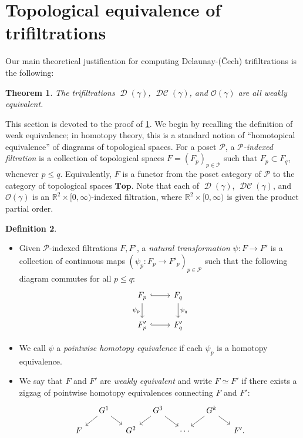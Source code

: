 \documentclass[11pt]{amsart}
\newcommand{\R}{\mathbb{R}} %
\DeclareMathOperator{\Del}{\mathcal{D}}
\DeclareMathOperator{\DelCech}{\mathcal{DC}}
\newcommand{\Top}{\textbf{Top}}
\newcommand{\deff}{\emph}
\newcommand{\Offset}[0]{\mathcal{O}}
\theoremstyle{plain}
\newtheorem{theorem}{Theorem}[section]
\theoremstyle{definition}
\newtheorem{definition}[theorem]{Definition}
\theoremstyle{remark}
\begin{document}
\section{Topological equivalence of trifiltrations}\label{sec:top_equiv}
Our main theoretical justification for computing Delaunay-(\v Cech) trifiltrations is the following:  
%
\begin{theorem}\label{thm:main} The trifiltrations $\Del(\gamma)$, $\DelCech(\gamma)$, and $\Offset(\gamma)$  are all weakly equivalent.
\end{theorem}
%
This section is devoted to the proof of \cref{thm:main}.  We begin by recalling the definition of weak equivalence; in homotopy theory, this is a standard notion of ``homotopical equivalence'' of diagrams of topological spaces.  
For a poset $\mathcal{P}$, a \deff{$\mathcal{P}$-indexed filtration} is a collection of topological spaces $F=(F_p)_{p \in \mathcal{P}}$ 
such that $F_p \subset F_q$, whenever $p \leq q$.  
Equivalently, $F$ is a functor from the poset category of $\mathcal{P}$ to the category of topological spaces $\Top$.   Note that each of $\Del(\gamma)$, $\DelCech(\gamma)$, and $\Offset(\gamma)$ is an $\R^2\times [0,\infty)$-indexed filtration, where $\R^2\times [0,\infty)$ is given the product partial order.  
%
\begin{definition}\label{def:top_equiv}\mbox{}
\begin{itemize}
\item[(i)] Given  $\mathcal{P}$-indexed filtrations $F,F'$, a \deff{natural transformation} $\psi\colon F\to F'$ is a collection 
 of continuous maps $(\psi_p:F_p \to F'_p)_{p \in \mathcal{P}}$ such that the following diagram commutes for all $p\leq q$:
 \[
\begin{tikzcd}
    F_p \arrow[r, hook] \arrow[d,"\psi_p",swap] & F_q \arrow[d,"\psi_q"] \\
    F'_p \arrow[r, hook] & F'_q
\end{tikzcd} \]
\item[(ii)] We call $\psi$ a \deff{pointwise homotopy equivalence} if each $\psi_p$ is a homotopy equivalence.  
\item[(iii)] We say that $F$ and $F'$ are \deff{weakly equivalent} and write $F\simeq F'$ if there exists a zigzag of pointwise homotopy equivalences connecting $F$ and $F'$:
\[
\begin{tikzcd}[row sep=small, column sep=small]
 & G^1 \arrow[dr] \arrow[dl] & & G^3  \arrow[dr] \arrow[dl] & & G^k  \arrow[dr] \arrow[dl] & \\
F  & & G^2 & & \cdots & & F'.
\end{tikzcd}
\]
\end{itemize}
\end{definition}
\end{document}
